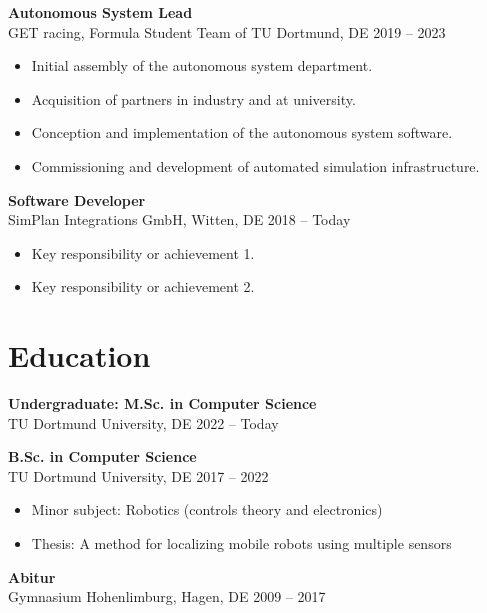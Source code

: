 \documentclass[a4paper,11pt]{article}
\begin{document}
\begin{minipage}[t]{0.65\textwidth}
    \vspace{0.2cm}

    \textbf{Autonomous System Lead} \\ GET racing, Formula Student Team of TU Dortmund, DE \hfill 2019 -- 2023
    \begin{itemize}
        \item Initial assembly of the autonomous system department.
        \item Acquisition of partners in industry and at university.
        \item Conception and implementation of the autonomous system software.
        \item Commissioning and development of automated simulation infrastructure.
    \end{itemize}

    \vspace{0.2cm}

    \textbf{Software Developer} \\ SimPlan Integrations GmbH, Witten, DE \hfill 2018 -- Today
    \begin{itemize}
        \item Key responsibility or achievement 1.
        \item Key responsibility or achievement 2.
    \end{itemize}

    \section*{Education}
    \textbf{Undergraduate: M.Sc. in Computer Science} \\ TU Dortmund University, DE \hfill 2022 -- Today

    \vspace{0.2cm}

    \textbf{B.Sc. in Computer Science} \\ TU Dortmund University, DE \hfill 2017 -- 2022
    \begin{itemize}
        \item Minor subject: Robotics (controls theory and electronics)
        \item Thesis: A method for localizing mobile robots using multiple sensors
    \end{itemize}

    \vspace{0.2cm}

    \textbf{Abitur} \\ Gymnasium Hohenlimburg, Hagen, DE \hfill 2009 -- 2017


\end{minipage}
\end{document}
